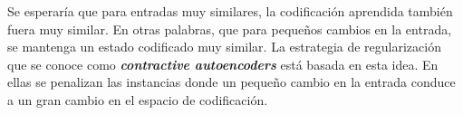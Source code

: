 

Se esperaría que para entradas muy similares, la codificación aprendida también fuera muy similar. En otras palabras, que para pequeños cambios en la entrada, se mantenga un estado codificado muy similar. La estrategia de regularización que se conoce como  \textbf{\textit{contractive autoencoders}} está basada en esta idea. 
En ellas se penalizan las instancias donde un pequeño cambio en la entrada conduce a un gran cambio en el espacio de codificación.  

